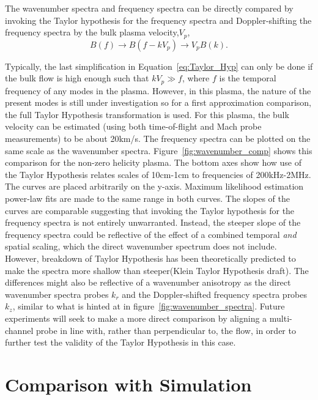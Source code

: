 \documentclass[aip,prl,amsmath,amssymb,reprint,superscriptaddress]{revtex4-1} %
\begin{document}
The wavenumber spectra and frequency spectra can be directly compared by invoking the Taylor hypothesis for the frequency spectra and Doppler-shifting the frequency spectra by the bulk plasma velocity,$V_{p}$,
\begin{equation}
B(f) \longrightarrow B(f-kV_{p}) \longrightarrow V_{p}B(k).
\label{eq:Taylor_Hyp}
\end{equation}

Typically, the last simplification in Equation~\ref{eq:Taylor_Hyp} can only be done if the bulk flow is high enough such that $kV_{p} \gg f$, where $f$ is the temporal frequency of any modes in the plasma. However, in this plasma, the nature of the present modes is still under investigation so for a first approximation comparison, the full Taylor Hypothesis transformation is used. For this plasma, the bulk velocity can be estimated (using both time-of-flight and Mach probe measurements) to be about 20km/s. The frequency spectra can be plotted on the same scale as the wavenumber spectra. Figure~\ref{fig:wavenumber_comp} shows this comparison for the non-zero helicity plasma. The bottom axes show how use of the Taylor Hypothesis relates scales of 10cm-1cm to frequencies of 200kHz-2MHz. The curves are placed arbitrarily on the y-axis. Maximum likelihood estimation power-law fits are made to the same range in both curves. The slopes of the curves are comparable suggesting that invoking the Taylor hypothesis for the frequency spectra is not entirely unwarranted. Instead, the steeper slope of the frequency spectra could be reflective of the effect of a combined temporal {\it and} spatial scaling, which the direct wavenumber spectrum does not include. However, breakdown of Taylor Hypothesis has been theoretically predicted to make the spectra more shallow than steeper(Klein Taylor Hypothesis draft). The differences might also be reflective of a wavenumber anisotropy as the direct wavenumber spectra probes $k_{r}$ and the Doppler-shifted frequency spectra probes $k_{z}$, similar to what is hinted at in figure~\ref{fig:wavenumber_spectra}. Future experiments will seek to make a more direct comparison by aligning a multi-channel probe in line with, rather than perpendicular to, the flow, in order to further test the validity of the Taylor Hypothesis in this case.

\section{Comparison with Simulation}\label{sec:simulation}
\end{document}
